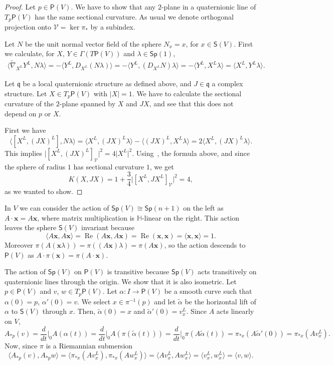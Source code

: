 \documentclass[12pt, a4paper]{amsart}
\newcommand{\g}{\mathfrak}
\renewcommand{\H}{\mathbb{H}}
\renewcommand{\Re}{\operatorname{Re}}
\newcommand{\Sp}{\mathsf{Sp}}
\theoremstyle{remark}
\begin{document}
\begin{proof}
Let $p\in\mathsf{P}(V)$.
We have to show that any $2$-plane in a quaternionic line of $T_p\mathsf{P}(V)$ has the same sectional curvature.
As usual we denote orthogonal projection onto $\mathcal{V}=\ker\pi_*$ by a subindex.

Let $N$ be the unit normal vector field of the sphere $N_x=x$, for $x\in\mathsf{S}(V)$.
First we calculate, for $X$, $Y\in\Gamma(T\mathsf{P}(V))$ and $\lambda\in\Sp(1)$,
\[
\begin{aligned}
\langle \tilde{\nabla}_{X^L} Y^L,N\lambda\rangle
=-\langle Y^L,D_{X^L}(N\lambda)\rangle
=-\langle Y^L,(D_{X^L}N)\lambda\rangle
=-\langle Y^L,X^L \lambda\rangle
=\langle X^L,Y^L \lambda\rangle.
\end{aligned}
\]

Let $\g{q}$ be a local quaternionic structure as defined above, and $J\in\g{q}$ a complex structure.
Let $X\in T_p\mathsf{P}(V)$ with $\lvert X\rvert=1$. 
We have to calculate the sectional curvature of the $2$-plane spanned by $X$ and $JX$, and see that this does not depend on $p$ or $X$.

First we have 
\[
\langle[X^L,(JX)^L],N\lambda\rangle
=\langle X^L,(JX)^L\lambda\rangle-\langle(JX)^L,X^L\lambda\rangle
=2\langle X^L,(JX)^L\lambda\rangle.
\]
This implies $\lvert[X^L,(JX)^L]_\mathcal{V}\rvert^2=4\lvert X^L\rvert^2$.
Using~\cite[Corollary~1]{ONeill}, the formula above, and since the sphere of radius $1$ has sectional curvature $1$, we get
\[
K(X, JX)
=1+\frac{3}{4}\bigl\lvert[X^L,JX^L]_\mathcal{V}\bigr\rvert^2
=4,
\]
as we wanted to show.
\end{proof}

In $V$ we can consider the action of $\Sp(V)\cong\Sp(n+1)$ on the left as
$A\cdot\mathbf{x}=A\mathbf{x}$, where matrix multiplication is $\H$-linear on the right.
This action leaves the sphere $\mathsf{S}(V)$ invariant because
\[
\langle A\mathbf{x},A\mathbf{x}\rangle
=\Re(A\mathbf{x},A\mathbf{x})
=\Re(\mathbf{x},\mathbf{x})
=\langle \mathbf{x},\mathbf{x}\rangle=1.
\]
Moreover $\pi(A(\mathbf{x}\lambda))=\pi((A\mathbf{x})\lambda)=\pi(A\mathbf{x})$, so the action descends to $\mathsf{P}(V)$ as $A\cdot\pi(\mathbf{x})=\pi(A\cdot\mathbf{x})$.

The action of $\Sp(V)$ on $\mathsf{P}(V)$ is transitive because $\Sp(V)$ acts transitively on quaternionic lines through the origin.
We show that it is also isometric.
Let $p\in\mathsf{P}(V)$ and $v$, $w\in T_p\mathsf{P}(V)$.
Let $\alpha\colon I\to\mathsf{P}(V)$ be a smooth curve such that $\alpha(0)=p$, $\alpha'(0)=v$.
We select $x\in\pi^{-1}(p)$ and let $\tilde{\alpha}$ be the horizontal lift of $\alpha$ to $\mathsf{S}(V)$ through $x$.
Then, $\tilde{\alpha}(0)=x$ and $\tilde{\alpha}'(0)=v_x^L$.
Since $A$ acts linearly on $V$,
\[
A_{*p}(v)
=\frac{d}{dt}\Big\vert_0 A(\alpha(t))
=\frac{d}{dt}\Big\vert_0 A(\pi(\tilde{\alpha}(t)))
=\frac{d}{dt}\Big\vert_0 \pi(A\tilde{\alpha}(t))
=\pi_{*x}(A\tilde{\alpha}'(0))
=\pi_{*x}(Av_x^L).
\]
Now, since $\pi$ is a Riemannian submersion
\[
\langle A_{*p}(v),A_{*p}w\rangle
=\langle \pi_{*x}(A v_x^L),\pi_{*x}(A w_x^L)\rangle
=\langle A v_x^L,A w_x^L\rangle
=\langle v_x^L,w_x^L\rangle
=\langle v,w\rangle.
\]
\end{document}

